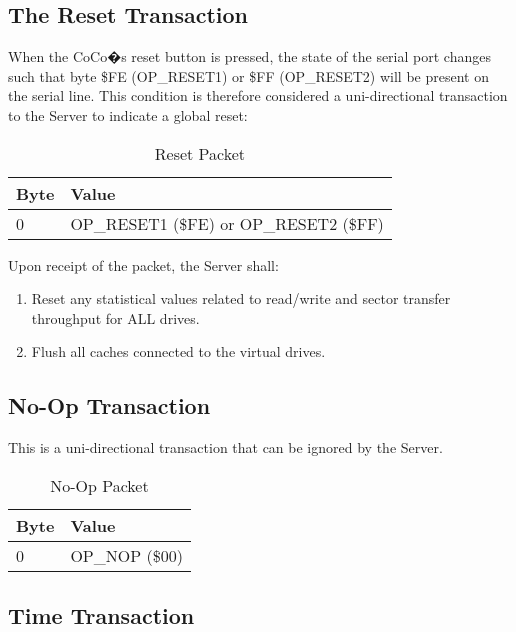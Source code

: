 \documentclass{article}
\begin{document}
\subsection{The Reset Transaction}

When the CoCo�s reset button is pressed, the state of the serial port changes such that byte \$FE (OP\_RESET1) or \$FF (OP\_RESET2) will be present on the serial line. This condition is therefore considered a uni-directional transaction to the Server to indicate a global reset:

\begin{table}[ht]
\caption{Reset Packet}
\begin{center}
\begin{tabular}{|ll|}
\hline
Byte & Value \\ \hline
0 & OP\_RESET1 (\$FE) or OP\_RESET2 (\$FF) \\
\hline
\end{tabular}
\end{center}
\end{table}

Upon receipt of the packet, the Server shall:

\begin{enumerate}
\item Reset any statistical values related to read/write and sector transfer throughput for ALL drives.
\item Flush all caches connected to the virtual drives.
\end{enumerate}

\subsection{No-Op Transaction}

This is a uni-directional transaction that can be ignored by the Server.

\begin{table}[ht]
\caption{No-Op Packet}
\begin{center}
\begin{tabular}{|ll|}
\hline
Byte & Value \\ \hline
0 & OP\_NOP (\$00) \\
\hline
\end{tabular}
\end{center}
\end{table}

\subsection{Time Transaction}
\end{document}
